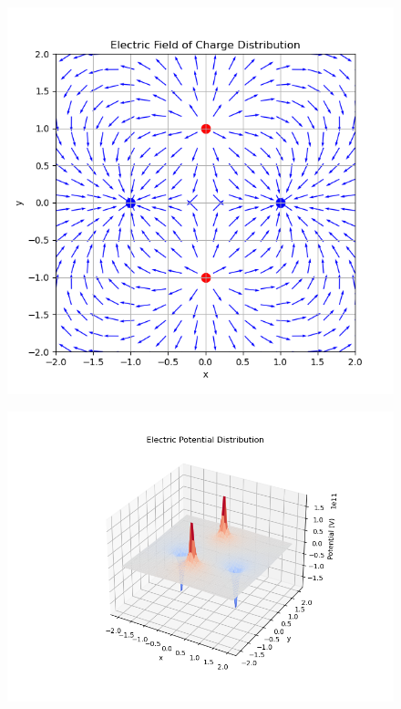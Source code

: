 \documentclass{article}
\begin{document}
\begin{figure}[H]
    \centering
    \includegraphics[width=\textwidth]{figs/6a.png}
\end{figure}
\begin{figure}[H]
    \centering
    \includegraphics[width=\textwidth]{figs/6b.png}
\end{figure}
\end{document}
